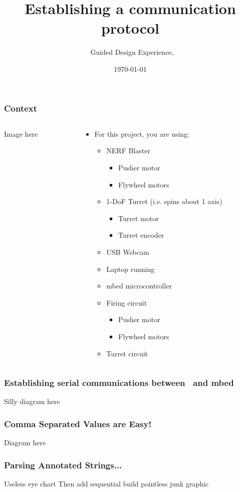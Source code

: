 \documentclass[aspectratio=169]{beamer}
\title{Establishing a communication protocol}
\subtitle{\usnaCourseNumber\ Guided Design Experience, \usnaCourseTerm}
\author{\usnaInstructorShort}
\date{\today}
\begin{document}
\settitlebg
\begin{frame}
\titlepage
\end{frame}

\setslidebg
\begin{frame}
\frametitle{Context}
\begin{columns}
\begin{column}{0.5\textwidth}
Image here
\end{column}
\begin{column}{0.5\textwidth}
\begin{itemize}
\item For this project, you are using:
\begin{itemize}
\item NERF Blaster
\begin{itemize}
\item Pusher motor
\item Flywheel motors
\end{itemize}
\item 1-DoF Turret (i.e. spins about 1 axis)
\begin{itemize}
\item Turret motor
\item Turret encoder
\end{itemize}
\item USB Webcam
\item Laptop running \Matlab
\item mbed microcontroller
\item Firing circuit
\begin{itemize}
\item Pusher motor
\item Flywheel motors
\end{itemize}
\item Turret circuit
\end{itemize}
\end{itemize}
\end{column}
\end{columns}

\begin{frame}
\frametitle{Establishing serial communications between \Matlab\ and mbed}
Silly diagram here
\end{frame}

\begin{frame}
\frametitle{Comma Separated Values are Easy!}
Diagram here
\end{frame}

\begin{frame}
\frametitle{Parsing Annotated Strings...}
Useless eye chart 
Then add sequential build pointless junk graphic
\end{frame}


\end{frame}
\end{document}
